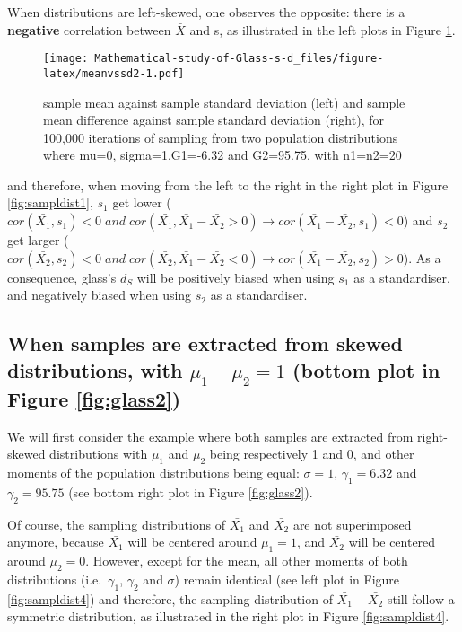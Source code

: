 \documentclass[
  man,floatsintext]{apa6}
\begin{document}
When distributions are left-skewed, one observes the opposite: there is a \textbf{negative} correlation between \(\bar{X}\) and s, as illustrated in the left plots in Figure \ref{fig:meanvssd2}.

\begin{figure}
\centering
\texttt{[image: Mathematical-study-of-Glass-s-d\_files/figure-latex/meanvssd2-1.pdf]}
\caption{\label{fig:meanvssd2}sample mean against sample standard deviation (left) and sample mean difference against sample standard deviation (right), for 100,000 iterations of sampling from two population distributions where mu=0, sigma=1,G1=-6.32 and G2=95.75, with n1=n2=20}
\end{figure}

and therefore, when moving from the left to the right in the right plot in Figure \ref{fig:sampldist1}, \(s_1\) get lower (\(cor(\bar{X_1},s_1) < 0 \; and \; cor(\bar{X_1},\bar{X_1}-\bar{X_2}>0) \rightarrow cor(\bar{X_1}-\bar{X_2},s_1)<0\)) and \(s_2\) get larger (\(cor(\bar{X_2},s_2) < 0 \; and \; cor(\bar{X_2},\bar{X_1}-\bar{X_2}<0) \rightarrow cor(\bar{X_1}-\bar{X_2},s_2)>0\)). As a consequence, glass's \(d_S\) will be positively biased when using \(s_1\) as a standardiser, and negatively biased when using \(s_2\) as a standardiser.

\hypertarget{when-samples-are-extracted-from-skewed-distributions-with-mu_1-mu_21-bottom-plot-in-figure}{%
\subsection{\texorpdfstring{When samples are extracted from skewed distributions, with \textbf{\(\mu_1-\mu_2=1\)} (bottom plot in Figure \ref{fig:glass2})}{When samples are extracted from skewed distributions, with \textbackslash mu\_1-\textbackslash mu\_2=1 (bottom plot in Figure )}}\label{when-samples-are-extracted-from-skewed-distributions-with-mu_1-mu_21-bottom-plot-in-figure}}

We will first consider the example where both samples are extracted from right-skewed distributions with \(\mu_1\) and \(\mu_2\) being respectively 1 and 0, and other moments of the population distributions being equal: \(\sigma=1\), \(\gamma_1=6.32\) and \(\gamma_2=95.75\) (see bottom right plot in Figure \ref{fig:glass2}).

Of course, the sampling distributions of \(\bar{X_1}\) and \(\bar{X_2}\) are not superimposed anymore, because \(\bar{X_1}\) will be centered around \(\mu_1=1\), and \(\bar{X_2}\) will be centered around \(\mu_2=0\). However, except for the mean, all other moments of both distributions (i.e.~\(\gamma_1\), \(\gamma_2\) and \(\sigma\)) remain identical (see left plot in Figure \ref{fig:sampldist4}) and therefore, the sampling distribution of \(\bar{X_1}-\bar{X_2}\) still follow a symmetric distribution, as illustrated in the right plot in Figure \ref{fig:sampldist4}.
\end{document}
